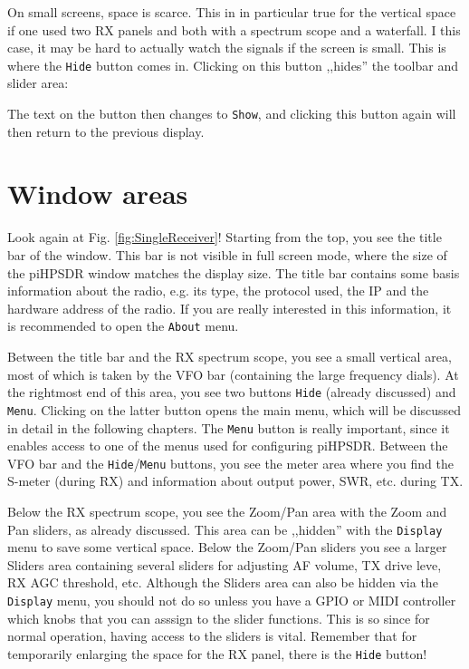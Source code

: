 \documentclass[12pt]{book}
\def\rett#1{\texttt{\color{red}#1}}
\begin{document}
On small screens, space is scarce. This in in particular true
for the vertical space if one used two RX panels and both
with a spectrum scope and a waterfall. I this case, it may be
hard to actually watch the signals if the screen is small.
This is where the \rett{Hide} button comes in. Clicking on
this button ,,hides'' the toolbar and slider area:


The text on the button then changes to \rett{Show}, and
clicking this button again will then return to the
previous display.

\section{Window areas}

Look again at Fig. \ref{fig:SingleReceiver}! Starting from the
top, you see the title bar of the window. This bar is not visible
in full screen mode, where the size of the piHPSDR window matches
the display size. The title bar contains some basis information
about the radio, e.g.  its type, the protocol used, the  IP
and the hardware address of the radio. If you are really interested
in this information, it is recommended to open the
\texttt{About} menu.

Between the title bar and the RX spectrum scope, you see
a small vertical area, most of  which is taken by the VFO bar
(containing the large frequency dials). At the rightmost
end of this area, you see two buttons \rett{Hide} (already
discussed) and \rett{Menu}. Clicking on the latter button opens
the main menu, which will be discussed in detail in the following
chapters. The \rett{Menu} button is really important, since it
enables access to one of the menus used for configuring piHPSDR.
Between the VFO bar and the \rett{Hide}/\rett{Menu} buttons,
you see the meter area where you find the S-meter (during RX)
and information about output power, SWR, etc. during TX.

Below the RX  spectrum scope, you see the Zoom/Pan area with
the  Zoom and Pan sliders, as already discussed. This area
can be ,,hidden'' with the \texttt{Display} menu to save some
vertical space. Below the
Zoom/Pan sliders you see a larger  Sliders area containing
several sliders for adjusting AF volume, TX  drive leve, 
RX  AGC threshold, etc. Although the Sliders area can also
be hidden via the \texttt{Display} menu, you should not do so
unless you have a GPIO or MIDI controller which knobs that
you can asssign to the slider functions. This is so since
for  normal operation, having access to the sliders is vital.
Remember that for temporarily enlarging the space for
the RX  panel, there is the \rett{Hide} button!
\end{document}
